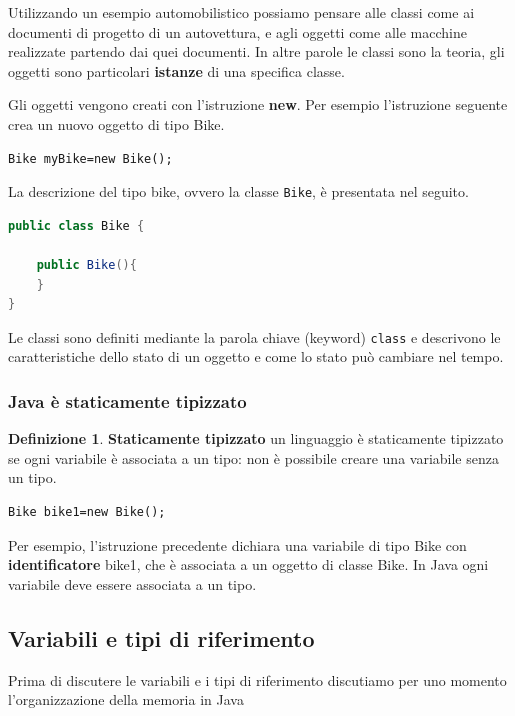 \documentclass{article}
\theoremstyle{definition}
\newtheorem{mydef}{Definizione}
\begin{document}
Utilizzando un esempio automobilistico possiamo pensare alle classi come ai documenti di progetto di un autovettura, e agli oggetti come alle macchine realizzate partendo dai quei documenti. In altre parole le classi sono la teoria, gli oggetti sono particolari \textbf{istanze} di una specifica classe. 

Gli oggetti vengono creati con l'istruzione \textbf{new}. Per esempio l'istruzione seguente crea un nuovo oggetto di tipo Bike. 
\begin{lstlisting}
Bike myBike=new Bike();
\end{lstlisting}
La descrizione del tipo bike, ovvero la classe \texttt{Bike}, \`e presentata nel seguito.
\begin{lstlisting}[language=Java,escapechar=|]
public class Bike {

	public Bike(){
	}
}
\end{lstlisting}
Le classi sono definiti mediante la parola chiave (keyword) \texttt{class} e descrivono le caratteristiche dello stato di un oggetto e come lo stato pu\`o cambiare nel tempo.


\subsubsection{Java \`e staticamente tipizzato}
\begin{mydef} \textbf{Staticamente tipizzato} un linguaggio \`e staticamente tipizzato se ogni variabile \`e associata a un tipo: non \`e possibile creare una variabile senza un tipo.
\end{mydef}
\begin{lstlisting}
Bike bike1=new Bike();
\end{lstlisting}
Per esempio, l'istruzione precedente dichiara una variabile di tipo Bike con \textbf{identificatore} bike1, che \`e associata a un oggetto di classe Bike. 
In Java ogni variabile deve essere associata a un tipo.


\subsection{Variabili e tipi di riferimento}
Prima di discutere le variabili e i tipi di riferimento discutiamo per uno momento l'organizzazione della memoria in Java 
\end{document}
